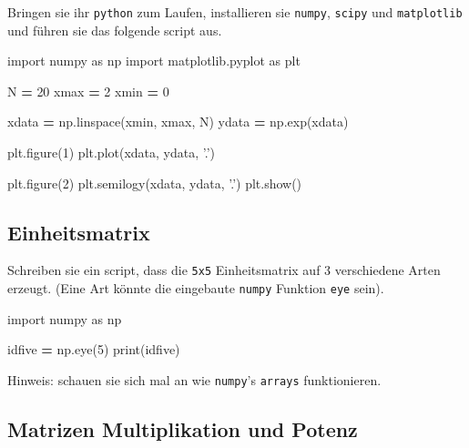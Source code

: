 \documentclass[]{book}
\newenvironment{Shaded}{\begin{snugshade}}{\end{snugshade}}
\newcommand{\BuiltInTok}[1]{#1}
\newcommand{\DecValTok}[1]{\textcolor[rgb]{0.00,0.00,0.81}{#1}}
\newcommand{\ImportTok}[1]{#1}
\newcommand{\NormalTok}[1]{#1}
\newcommand{\OperatorTok}[1]{\textcolor[rgb]{0.81,0.36,0.00}{\textbf{#1}}}
\newcommand{\StringTok}[1]{\textcolor[rgb]{0.31,0.60,0.02}{#1}}
\theoremstyle{definition}
\theoremstyle{definition}
\theoremstyle{definition}
\theoremstyle{definition}
\theoremstyle{remark}
\begin{document}
Bringen sie ihr \texttt{python} zum Laufen, installieren sie \texttt{numpy}, \texttt{scipy} und \texttt{matplotlib} und führen sie das folgende script aus.

\begin{Shaded}
\begin{Highlighting}[]
\ImportTok{import}\NormalTok{ numpy }\ImportTok{as}\NormalTok{ np}
\ImportTok{import}\NormalTok{ matplotlib.pyplot }\ImportTok{as}\NormalTok{ plt}

\NormalTok{N }\OperatorTok{=} \DecValTok{20}
\NormalTok{xmax }\OperatorTok{=} \DecValTok{2}
\NormalTok{xmin }\OperatorTok{=} \DecValTok{0}

\NormalTok{xdata }\OperatorTok{=}\NormalTok{ np.linspace(xmin, xmax, N)}
\NormalTok{ydata }\OperatorTok{=}\NormalTok{ np.exp(xdata)}

\NormalTok{plt.figure(}\DecValTok{1}\NormalTok{)}
\NormalTok{plt.plot(xdata, ydata, }\StringTok{'.'}\NormalTok{)}

\NormalTok{plt.figure(}\DecValTok{2}\NormalTok{)}
\NormalTok{plt.semilogy(xdata, ydata, }\StringTok{'.'}\NormalTok{)}
\NormalTok{plt.show()}
\end{Highlighting}
\end{Shaded}

\hypertarget{einheitsmatrix}{%
\subsection{Einheitsmatrix}\label{einheitsmatrix}}

Schreiben sie ein script, dass die \texttt{5x5} Einheitsmatrix auf 3 verschiedene Arten erzeugt. (Eine Art könnte die eingebaute \texttt{numpy} Funktion \texttt{eye} sein).

\begin{Shaded}
\begin{Highlighting}[]
\ImportTok{import}\NormalTok{ numpy }\ImportTok{as}\NormalTok{ np}

\NormalTok{idfive }\OperatorTok{=}\NormalTok{ np.eye(}\DecValTok{5}\NormalTok{)}
\BuiltInTok{print}\NormalTok{(idfive)}
\end{Highlighting}
\end{Shaded}

Hinweis: schauen sie sich mal an wie \texttt{numpy}'s \texttt{arrays} funktionieren.

\hypertarget{matrizen-multiplikation-und-potenz}{%
\subsection{Matrizen Multiplikation und Potenz}\label{matrizen-multiplikation-und-potenz}}
\end{document}
